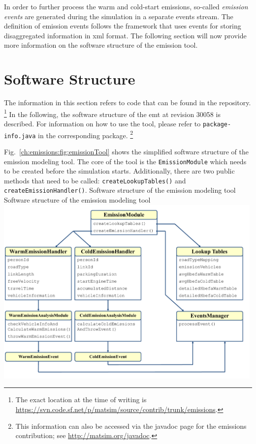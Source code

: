 In order to further process the warm and cold-start emissions, so-called 
\emph{emission events} are generated during the simulation in a separate 
events stream. The definition of emission events follows the  
framework that uses events for storing disaggregated information in 
\acrshort{xml} format. The following section will now provide more information 
on the software structure of the emission tool.

\section{Software Structure}
\label{ch:emissions:structure}
The information in this section refers to code that can be found in the 
 repository.%
%
\footnote{
%
The exact location at the time of writing is 
\url{https://svn.code.sf.net/p/matsim/source/contrib/trunk/emissions}.
%
}
In the following, the software structure of the \gls{emt} at 
revision 30058 is described. For information on how to use the tool, please 
refer to \lstinline|package-info.java| in the corresponding package.%
%
\footnote{
%
This information can also be accessed via the javadoc page for the emissions contribution; see \url{http://matsim.org/javadoc}.
%
}
%

Fig.~\ref{ch:emissions:fig:emissionTool} shows the simplified software structure of the emission modeling tool. The core of the tool is the \lstinline|EmissionModule| which needs to be created before the simulation starts. Additionally, there are two public methods that need to be called: \lstinline|createLookupTables()| and \lstinline|createEmissionHandler()|.
%
\createfigure%
{Software structure of the emission modeling tool}%
{Software structure of the emission modeling tool}%
{\label{ch:emissions:fig:emissionTool}}%
{\includegraphics[width=0.99\textwidth, angle=0]{extending/figures/emissionToolOverview_pdfa.pdf}}%
{}

